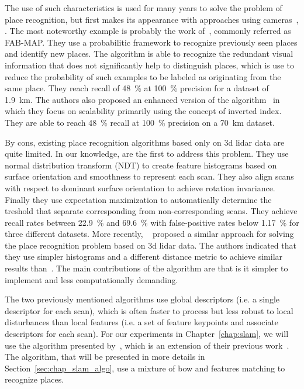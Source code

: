 The use of such characteristics is used for many years to solve the problem of place recognition, but first makes its appearance with approaches using cameras~\citep{Torralba2003}, \cite{Ulrich2000}. The most noteworthy example is probably the work of~\citet{Cummins2008}, commonly referred as FAB-MAP. They use a probabilitic framework to recognize previously seen places and identify new places. The algorithm is able to recognize the redundant visual information that does not significantly help to distinguish places, which is use to reduce the probability of such examples to be labeled as originating from the same place. They reach recall of \SI{48}{\percent} at \SI{100}{\percent} precision for a dataset of \SI{1.9}{\kilo\meter}. The authors also proposed an enhanced version of the algorithm~\cite{Cummins2011} in which they focus on scalability primarily using the concept of inverted index. They are able to reach \SI{48}{\percent} recall at \SI{100}{\percent} precision on a \SI{70}{\kilo\meter} dataset.

By cons, existing place recognition algorithms based only on \gls*{3d} \gls*{lidar} data are quite limited. In our knowledge, \citet{Magnusson2009} are the first to address this problem. They use normal distribution transform (NDT) to create feature histograms based on surface orientation and smoothness to represent each scan. They also align scans with respect to dominant surface orientation to achieve rotation invariance. Finally they use expectation maximization to automatically determine the treshold that separate corresponding from non-corresponding scans. They achieve recall rates between \SI{22.9}{\percent} and \SI{69.6}{\percent} with false-positive rates below \SI{1.17}{\percent} for three different datasets. More recently, ~\citet{Mack2015} proposed a similar approach for solving the place recognition problem based on \gls*{3d} lidar data. The authors indicated that they use simpler histograms and a different distance metric to achieve similar results than~\citet{Magnusson2009}. The main contributions of the algorithm are that is it simpler to implement and less computationally demanding.

The two previously mentioned algorithms use global descriptors (i.e. a single descriptor for each scan), which is often faster to process but less robust to local disturbances than local features (i.e. a set of feature keypoints and associate descriptors for each scan). For our experiments in Chapter~\ref{chap:slam}, we will use the algorithm presented by~\cite{Steder2011b}, which is an extension of their previous work~\cite{Steder2010}. The algorithm, that will be presented in more details in Section~\ref{sec:chap_slam_algo}, use a mixture of \gls*{bow} and features matching to recognize places.

